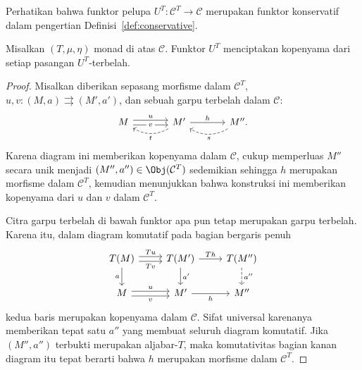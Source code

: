 Perhatikan bahwa funktor pelupa $U^T:\mathcal{C}^T\to\mathcal{C}$ merupakan
funktor konservatif dalam pengertian Definisi~\ref{def:conservative}.

\begin{lemma}\label{prop:UT-split-fork}
	Misalkan $(T,\mu,\eta)$ monad di atas $\mathcal{C}$. Funktor $U^T$
	menciptakan kopenyama dari setiap pasangan $U^T$-terbelah.
\end{lemma}
\begin{proof}
	Misalkan diberikan sepasang morfisme dalam $\mathcal{C}^T$,
	$u,v:(M,a)\rightrightarrows(M',a')$, dan sebuah garpu terbelah dalam
	$\mathcal{C}$:
	\begin{equation*}\begin{tikzcd}[column sep=large]
		M \arrow[shift left, r, "u"] \arrow[shift right, r, "v" description] & M' \arrow[r, "h"] \arrow[dashed, l, bend left, "t"] & M'' \arrow[dashed, l, bend left, "s"].
	\end{tikzcd}\end{equation*}
	Karena diagram ini memberikan kopenyama dalam $\mathcal{C}$, cukup
	memperluas $M''$ secara unik menjadi
	$(M'',a'')\in\Obj(\mathcal{C}^T)$ sedemikian sehingga $h$ merupakan
	morfisme dalam $\mathcal{C}^T$, kemudian menunjukkan bahwa konstruksi ini
	memberikan kopenyama dari $u$ dan $v$ dalam $\mathcal{C}^T$.

	Citra garpu terbelah di bawah funktor apa pun tetap merupakan garpu
	terbelah. Karena itu, dalam diagram komutatif pada bagian bergaris penuh
	\[\begin{tikzcd}
		T(M) \arrow[shift left, r, "Tu"] \arrow[shift right, r, "Tv"'] \arrow[d, "a"'] & T(M') \arrow[r, "Th"] \arrow[d, "{a'}"] & T(M'') \arrow[dashed, d, "{a''}"] \\
		M \arrow[shift left, r, "u"] \arrow[shift right, r, "v"'] & M' \arrow[r, "h"'] & M''
	\end{tikzcd}\]
	kedua baris merupakan kopenyama dalam $\mathcal{C}$. Sifat universal
	karenanya memberikan tepat satu $a''$ yang membuat seluruh diagram
	komutatif. Jika $(M'',a'')$ terbukti merupakan aljabar-$T$, maka
	komutativitas bagian kanan diagram itu tepat berarti bahwa $h$ merupakan
	morfisme dalam $\mathcal{C}^T$.


\end{proof}
